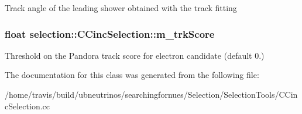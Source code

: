 Track angle of the leading shower obtained with the track fitting \hypertarget{classselection_1_1CCincSelection_a2c3b80516e3731ec9b4f5ccbee6864ba}{
\subsubsection[{m\-\_\-trk\-Score}]{\setlength{\rightskip}{0pt plus 5cm}float selection\-::\-C\-Cinc\-Selection\-::m\-\_\-trk\-Score\hspace{0.3cm}{\ttfamily [private]}}}\label{classselection_1_1CCincSelection_a2c3b80516e3731ec9b4f5ccbee6864ba}
Threshold on the Pandora track score for electron candidate (default 0.) 

The documentation for this class was generated from the following file\-:\begin{DoxyCompactItemize}
\item 
/home/travis/build/ubneutrinos/searchingfornues/\-Selection/\-Selection\-Tools/C\-Cinc\-Selection.\-cc\end{DoxyCompactItemize}
